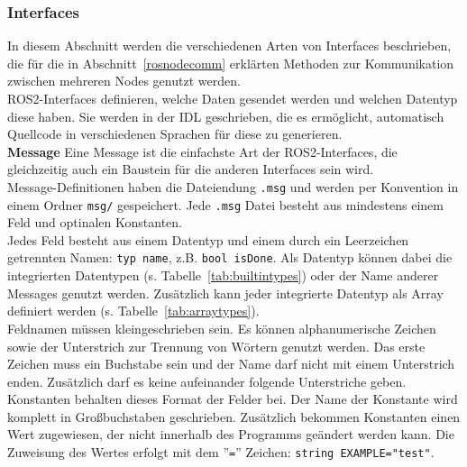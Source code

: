 \subsubsection{Interfaces}
In diesem Abschnitt werden die verschiedenen Arten von Interfaces beschrieben, die für die in Abschnitt~\ref{rosnodecomm} erklärten Methoden zur Kommunikation zwischen mehreren Nodes genutzt werden.\\
\ac{ROS2}-Interfaces definieren, welche Daten gesendet werden und welchen Datentyp diese haben.
Sie werden in der \ac{IDL} geschrieben, die es ermöglicht, automatisch Quellcode in verschiedenen Sprachen für diese zu generieren.\\

\textbf{Message} Eine Message ist die einfachste Art der \ac{ROS2}-Interfaces, die gleichzeitig auch ein Baustein für die anderen Interfaces sein wird.\\
Message-Definitionen haben die Dateiendung \verb|.msg| und werden per Konvention in einem Ordner \verb|msg/| gespeichert.
Jede \verb|.msg| Datei besteht aus mindestens einem Feld und optinalen Konstanten.\\
Jedes Feld besteht aus einem Datentyp und einem durch ein Leerzeichen getrennten Namen: \verb|typ name|, z.B. \verb|bool isDone|.
Als Datentyp können dabei die integrierten Datentypen (s. Tabelle~\ref{tab:builtintypes}) oder der Name anderer Messages genutzt werden.
Zusätzlich kann jeder integrierte Datentyp als Array definiert werden (s. Tabelle~\ref{tab:arraytypes}).\\
Feldnamen müssen kleingeschrieben sein.
Es können alphanumerische Zeichen sowie der Unterstrich zur Trennung von Wörtern genutzt werden.
Das erste Zeichen muss ein Buchstabe sein und der Name darf nicht mit einem Unterstrich enden.
Zusätzlich darf es keine aufeinander folgende Unterstriche geben.\\
Konstanten behalten dieses Format der Felder bei.
Der Name der Konstante wird komplett in Großbuchstaben geschrieben.
Zusätzlich bekommen Konstanten einen Wert zugewiesen, der nicht innerhalb des Programms geändert werden kann.
Die Zuweisung des Wertes erfolgt mit dem ''\verb|=|'' Zeichen: \verb|string EXAMPLE="test"|.

